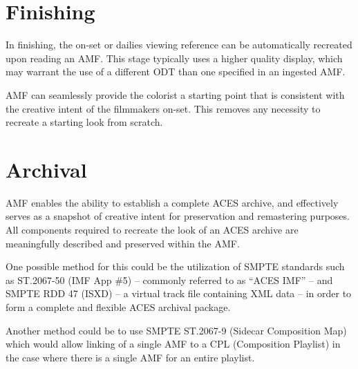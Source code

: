 \section{Finishing}
In finishing, the on-set or dailies viewing reference can be automatically recreated upon reading an AMF. This stage typically uses a higher quality display, which may warrant the use of a different ODT than one specified in an ingested AMF.

AMF can seamlessly provide the colorist a starting point that is consistent with the creative intent of the filmmakers on-set. This removes any necessity to recreate a starting look from scratch.

\section{Archival}
AMF enables the ability to establish a complete ACES archive, and effectively serves as a snapshot of creative intent for preservation and remastering purposes. All components required to recreate the look of an ACES archive are meaningfully described and preserved within the AMF.

One possible method for this could be the utilization of SMPTE standards such as ST.2067-50 (IMF App \#5) -- commonly referred to as ``ACES IMF'' -- and SMPTE RDD 47 (ISXD) -- a virtual track file containing XML data -- in order to form a complete and flexible ACES archival package.

Another method could be to use SMPTE ST.2067-9 (Sidecar Composition Map) which would allow linking of a single AMF to a CPL (Composition Playlist) in the case where there is a single AMF for an entire playlist.
